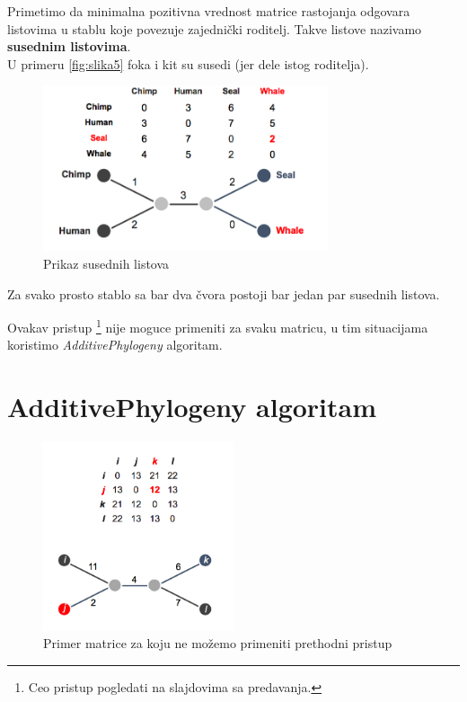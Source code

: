 Primetimo da minimalna pozitivna vrednost matrice rastojanja odgovara listovima u stablu koje povezuje zajedni\v{c}ki roditelj. Takve listove nazivamo \textbf{susednim listovima}.\\

U primeru \ref{fig:slika5} foka i kit su susedi (jer dele istog roditelja).

\begin{figure}[h]
\centering
\includegraphics[width=0.75\textwidth]{poglavlja/7/slike/slika5.png}
\caption{Prikaz susednih listova}
\end{figure} 

\begin{teorema}
Za svako prosto stablo sa bar dva \v{c}vora postoji bar jedan par susednih listova.
\end{teorema}

Ovakav pristup \footnote{Ceo pristup pogledati na slajdovima sa predavanja.} nije moguce primeniti za svaku matricu, u tim situacijama koristimo \textit{AdditivePhylogeny} algoritam.

\section{AdditivePhylogeny algoritam}
\label{addalg}

\begin{figure}[h]
\centering
\includegraphics[width=0.5\textwidth]{poglavlja/7/slike/slika6.png}
\caption{Primer matrice za koju ne mo\v{z}emo primeniti prethodni pristup}
\end{figure} 

